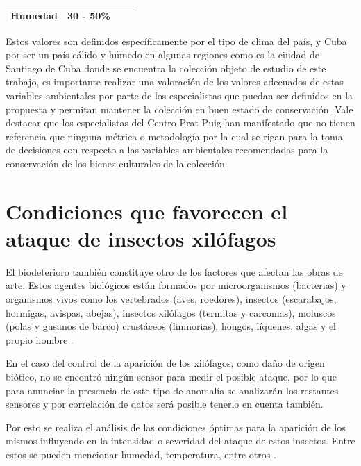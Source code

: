 \begin{table}[H]
\begin{tabular}{|l|l|c|l|}
        Humedad     & 30 - 50\%            &                                              &                                                                                                                                                                                                                                                                \\ \hline
        \end{tabular}
    \end{table}

    Estos valores son definidos específicamente por el tipo de clima del país, y Cuba por ser un país cálido y húmedo en algunas regiones como es la ciudad de Santiago de Cuba donde se encuentra la colección objeto de estudio de este trabajo,
    es importante realizar una valoración de los valores adecuados de estas variables ambientales por parte de los especialistas que puedan ser definidos en la propuesta y permitan mantener la colección en buen estado de conservación.
    Vale destacar que los especialistas del Centro Prat Puig han manifestado que no tienen referencia que ninguna métrica o metodología por la cual se rigan para la toma de decisiones con respecto a las variables ambientales recomendadas para la conservación de los bienes culturales de la colección.

    \section{Condiciones que favorecen el ataque de insectos xilófagos}

    El biodeterioro también constituye otro de los factores que afectan las obras de arte. Estos agentes biológicos están formados por microorganismos (bacterias) y organismos vivos como los vertebrados (aves, roedores), insectos (escarabajos, hormigas, avispas, abejas), insectos xilófagos (termitas y carcomas), moluscos (polas y gusanos de barco) crustáceos (limnorias), hongos, líquenes, algas y el propio hombre \cite{marquezAgentesDeterioroMedioambientales2016}.
    
    En el caso del control de la aparición de los xilófagos, como daño de origen biótico, no se encontró ningún sensor para medir el posible ataque, por lo que para anunciar la presencia de este tipo de anomalía se analizarán los restantes sensores y por correlación de datos será posible tenerlo en cuenta también.
    
    Por esto se realiza el análisis de las condiciones óptimas para la aparición de los mismos influyendo en la intensidad o severidad del ataque de estos insectos. Entre estos se pueden mencionar humedad, temperatura, entre otros \cite{ripa2004termitas}. 
    
